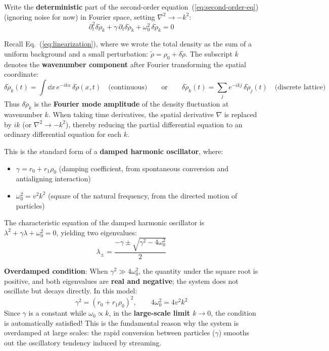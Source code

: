 \begin{derivation}
Write the \textbf{deterministic} part of the second-order equation~(\ref{eq:second-order-eq}) (ignoring noise for now) in Fourier space, setting $\nabla^2 \to -k^2$:
\begin{equation}\label{eq:damped-oscillator}
\partial_t^2 \delta\tilde{\rho}_k + \gamma\,\partial_t \delta\tilde{\rho}_k + \omega_0^2\,\delta\tilde{\rho}_k = 0
\end{equation}

\begin{notebox}
Recall Eq.~(\ref{eq:linearization}), where we wrote the total density as the sum of a uniform background and a small perturbation: $\tilde{\rho} = \rho_0 + \delta\tilde{\rho}$. The subscript $k$ denotes the \textbf{wavenumber component} after Fourier transforming the spatial coordinate:
\[
\delta\tilde{\rho}_k(t) = \int \dd x\, e^{-ikx}\,\delta\tilde{\rho}(x,t)
\quad\text{(continuous)}\qquad\text{or}\qquad
\delta\tilde{\rho}_k(t) = \sum_j e^{-ikj}\,\delta\tilde{\rho}_j(t)
\quad\text{(discrete lattice)}
\]
Thus $\delta\tilde{\rho}_k$ is the \textbf{Fourier mode amplitude} of the density fluctuation at wavenumber $k$. When taking time derivatives, the spatial derivative $\nabla$ is replaced by $ik$ (or $\nabla^2 \to -k^2$), thereby reducing the partial differential equation to an ordinary differential equation for each $k$.
\end{notebox}
This is the standard form of a \textbf{damped harmonic oscillator}, where:
\begin{itemize}
    \item $\gamma = r_0 + r_1\rho_0$ \quad(damping coefficient, from spontaneous conversion and antialigning interaction)
    \item $\omega_0^2 = v^2 k^2$ \quad(square of the natural frequency, from the directed motion of particles)
\end{itemize}

The characteristic equation of the damped harmonic oscillator is $\lambda^2 + \gamma\lambda + \omega_0^2 = 0$, yielding two eigenvalues:
\begin{equation}\label{eq:eigenvalues-full}
\lambda_{\pm} = \frac{-\gamma \pm \sqrt{\gamma^2 - 4\omega_0^2}}{2}
\end{equation}

\textbf{Overdamped condition}: When $\gamma^2 \gg 4\omega_0^2$, the quantity under the square root is positive, and both eigenvalues are \textbf{real and negative}; the system does not oscillate but decays directly. In this model:
\[
\gamma^2 = (r_0 + r_1\rho_0)^2, \qquad 4\omega_0^2 = 4v^2 k^2
\]
Since $\gamma$ is a constant while $\omega_0 \propto k$, in the \textbf{large-scale limit $k \to 0$}, the condition is automatically satisfied! This is the fundamental reason why the system is overdamped at large scales: the rapid conversion between particles ($\gamma$) smooths out the oscillatory tendency induced by streaming.


\end{derivation}
